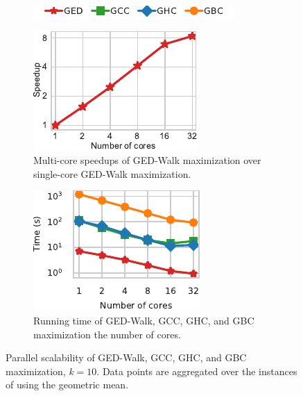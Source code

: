 \begin{figure}[tb]
\centering
\begin{subfigure}[t]{\textwidth}
\centering
\includegraphics{./sources/plots/ged-walk/legend-ged-time-vs-group.pdf}
\end{subfigure}\smallskip

\hfill
\begin{subfigure}[t]{.45\textwidth}
\centering
\includegraphics{./sources/plots/ged-walk/parallel-scalability.pdf}
\caption{Multi-core speedups of GED-Walk maximization over single-core GED-Walk
maximization.}
\label{fig:ged-walk:parallel-speedup}
\end{subfigure}\hfill
\begin{subfigure}[t]{.45\textwidth}
\centering
\includegraphics{./sources/plots/ged-walk/ged-multi-core-scal.pdf}
\caption{Running time of GED-Walk, GCC, GHC, and GBC maximization \wrt the number of
cores.}
\label{fig:ged-walk:parallel-time}
\end{subfigure}\hfill

\caption{Parallel scalability of GED-Walk, GCC, GHC, and GBC maximization, $k = 10$.
Data points are aggregated over the instances of 
using the geometric mean.}
\label{fig:ged-walk:parallel-scalability}
\end{figure}


